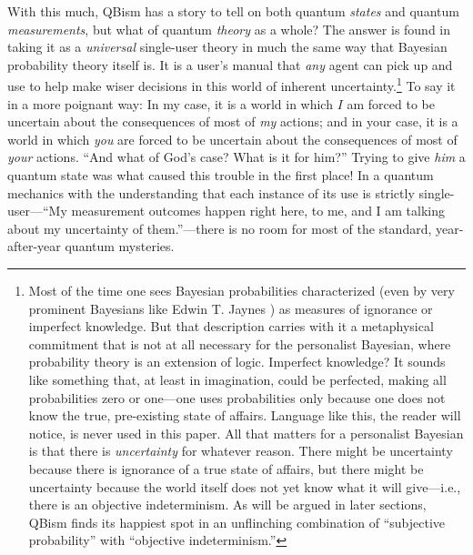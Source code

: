 \documentclass[aps,pra,superscriptaddress,10pt,tightenlines,twocolumn,nofootinbib]{revtex4}
\begin{document}
With this much, QBism has a story to tell on both quantum {\it states\/} and quantum {\it measurements}, but what of quantum {\it theory\/} as a whole?  The answer is found in taking it as a {\it universal\/} single-user theory in much the same way that Bayesian probability theory itself is.  It is a user's manual that {\it any\/} agent can pick up and use to help make wiser decisions in this world of inherent uncertainty.\footnote{\label{Macca} Most of the time one sees Bayesian probabilities characterized (even by very prominent Bayesians like Edwin T. Jaynes \cite{Jaynes03}) as measures of ignorance or imperfect knowledge.  But that description carries with it a metaphysical commitment that is not at all necessary for the personalist Bayesian, where probability theory is an extension of logic.  Imperfect knowledge?  It sounds like something that, at least in imagination, could be perfected, making all probabilities zero or one---one uses probabilities only because one does not know the true, pre-existing state of affairs.  Language like this, the reader will notice, is never used in this paper.  All that matters for a personalist Bayesian is that there is {\it uncertainty\/} for whatever reason.  There might be uncertainty because there is ignorance of a true state of affairs, but there might be uncertainty because the world itself does not yet know what it will give---i.e., there is an objective indeterminism.  As will be argued in later sections, QBism finds its happiest spot in an unflinching combination of ``subjective probability'' with ``objective indeterminism.''}  To say it in a more poignant way:  In my case, it is a world in which $I$ am forced to be uncertain about the consequences of most of {\it my\/} actions; and in your case, it is a world in which {\it you\/} are forced to be uncertain about the consequences of most of {\it your\/} actions.  ``And what of God's case?  What is it for him?''  Trying to give {\it him\/} a quantum state was what caused this trouble in the first place!  In a quantum mechanics with the understanding that each instance of its use is strictly single-user---``My measurement outcomes happen right here, to me, and I am talking about my uncertainty of them.''---there is no room for most of the standard, year-after-year quantum mysteries.
\end{document}
